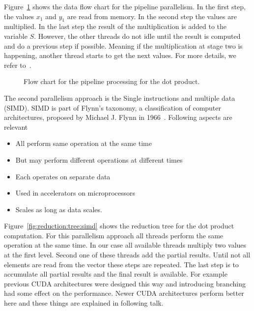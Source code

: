 \documentclass[11pt,fleqn]{book} %
\begin{document}
Figure~\ref{fig:dataflow:pipeline} shows the data flow chart for the pipeline parallelism. In the first step, the values $x_1$ and $y_1$ are read from memory. In the second step the values are multiplied. In the last step the result of the multiplication is added to the variable $S$. However, the other threads do not idle until the result is computed and do a previous step if possible. Meaning if the multiplication at stage two is happening, another thread starts to get the next values. For more details, we refer to~\cite{quinn2003parallel}. \\


\begin{figure}[tb]
\centering
{}
\caption{Flow chart for the pipeline processing for the dot product.}
\label{fig:dataflow:pipeline}
\end{figure}

The second parallelism approach is the Single instructions and multiple data (SIMD). SIMD is part of Flynn's taxonomy, a classification of computer architectures, proposed by Michael J. Flynn in 1966~\cite{flynn1972some,duncan1990survey}. Following aspects are relevant 
\begin{itemize}
\item All perform same operation at the same time
\item But may perform different operations at different times
\item Each operates on separate data
\item Used in accelerators on microprocessors
\item Scales as long as data scales.
\end{itemize}
\vspace{0.25cm}
Figure~\ref{fig:reduction:tree:simd} shows the reduction tree for the dot product computation. For this parallelism approach all threads perform the same operation at the same time. In our case all available threads multiply two values at the first level. Second one of these threads add the partial results. Until not all elements are read from the vector these steps are repeated. The last step is to accumulate all partial results and the final result is available. For example previous CUDA architectures were designed this way and introducing branching had some effect on the performance. Newer CUDA architectures perform better here and these things are explained in following talk.
\end{document}
